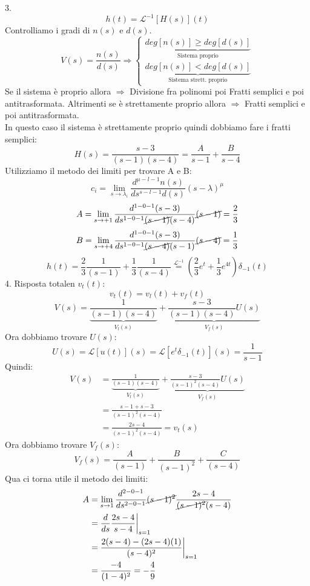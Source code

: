 \documentclass[a4paper]{article}
\begin{document}
3. 
\[h(t) = \mathcal{L}^{-1}[H(s)](t)\]
Controlliamo i gradi di $n(s)$ e $d(s)$. 
\[V(s) = \frac{n(s)}{d(s)} \Longrightarrow \begin{cases}
    \underbrace{deg[n(s)] \ge deg[d(s)]}_{\text{Sistema proprio}}\\
    \underbrace{deg[n(s)] < deg[d(s)]}_{\text{Sistema strett. proprio}} 
\end{cases}\]
Se il sistema è proprio allora $\Longrightarrow$ Divisione fra polinomi poi Fratti semplici e poi antitrasformata. Altrimenti
se è strettamente proprio allora $\Longrightarrow$ Fratti semplici e poi antitrasformata.\\
In questo caso il sistema è strettamente proprio quindi dobbiamo fare i fratti semplici:
\[H(s) = \frac{s-3}{(s-1)(s-4)} = \frac{A}{s-1} + \frac{B}{s-4}\]
Utilizziamo il metodo dei limiti per trovare A e B: 
\[c_{i} = \lim_{s \rightarrow \lambda_i}\frac{d^{\mu - l - 1}n(s)}{ds^{s-l-1}d(s)}(s-\lambda)^\mu\]
\[A = \lim_{s \rightarrow +1}\frac{d^{1 - 0 - 1}(s-3)}{ds^{1-0-1}\cancel{(s-1)}(s-4)}\cancel{(s-1)} = \frac{2}{3}\]
\[B = \lim_{s \rightarrow +4}\frac{d^{1 - 0 - 1}(s-3)}{ds^{1-0-1}\cancel{(s-4)}(s-1)}\cancel{(s-4)} = \frac{1}{3}\]
\[h(t) = \frac{2}{3}\frac{1}{(s-1)} + \frac{1}{3}\frac{1}{(s-4)} \stackrel{\mathcal{L}^{-1}}{=} \left(\frac{2}{3}e^t + \frac{1}{3}e^{4t}\right)\delta_{-1}(t)\]
4. Risposta totalen $v_t(t)$:
\[v_t(t) = v_l(t) + v_f(t)\]
\[V(s) = \underbrace{\frac{1}{(s-1)(s-4)}}_{V_l(s)} + \underbrace{\frac{s-3}{(s-1)(s-4)}U(s)}_{V_f(s)}\]
Ora dobbiamo trovare $U(s)$:
\[U(s) = \mathcal{L}[u(t)](s) = \mathcal{L}[e^t\delta_{-1}(t)](s) = \frac{1}{s-1}\]
Quindi: 
\begin{align*}
V(s) &= \underbrace{\frac{1}{(s-1)(s-4)}}_{V_l(s)} + \underbrace{\frac{s-3}{(s-1)^2(s-4)}U(s)}_{V_f(s)}\\
&= \frac{s-1 + s-3}{(s-1)^2(s-4)}\\
& = \frac{2s - 4}{(s-1)^2(s-4)} = v_t(s)
\end{align*}
Ora dobbiamo trovare $V_f(s)$:
\[V_f(s) = \frac{A}{(s-1)} + \frac{B}{(s-1)^2} + \frac{C}{(s-4)}\]
Qua ci torna utile il metodo dei limiti:
\begin{align*}
A &= \lim_{s \rightarrow 1} \frac{d^{2-0-1}}{ds^{2-0-1}} \cancel{(s-1)^2}\frac{2s-4}{\cancel{(s-1)^2}(s-4)}\\
&= \frac{d}{ds} \frac{2s - 4}{s-4}\bigg|_{s=1} \\
&= \frac{2(s-4) - (2s-4)(1)}{(s-4)^2}\bigg|_{s=1}\\
&= \frac{-4}{(1-4)^2} = -\frac{4}{9}
\end{align*}
\end{document}
